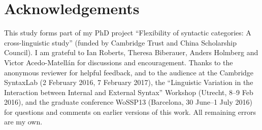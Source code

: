 \documentclass[output=paper]{langsci/langscibook}
\begin{document}
\printchapterglossary{}

\section*{Acknowledgements}

This study forms part of my PhD project ``Flexibility of syntactic categories: A
cross-linguistic study'' (funded by Cambridge Trust and China Scholarship
Council). I am grateful to Ian Roberts, Theresa Biberauer, Anders Holmberg and
V\'{\i}ctor Acedo-Matell\'{a}n for discussions and encouragement. Thanks to the
anonymous reviewer for helpful feedback, and to the audience at the Cambridge
SyntaxLab (2 February 2016, 7 February 2017), the ``Linguistic Variation in the
Interaction between Internal and External Syntax'' Workshop (Utrecht, 8--9 Feb
2016), and the graduate conference WoSSP13 (Barcelona, 30 June--1 July 2016)
for questions and comments on earlier versions of this work. All remaining
errors are my own.

{\sloppy
\printbibliography[heading=subbibliography,notkeyword=this]
}
\end{document}
